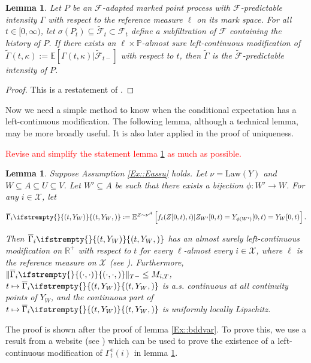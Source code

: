 \documentclass[12pt]{article}
\newcommand{\mb}{\mathbb}
\newcommand{\mc}{\mathcal}
\newcommand{\ra}{\rightarrow}
\newcommand{\ov}{\overline}
\newcommand{\te}{\text}
\newcommand{\tr}{\textcolor{red}}
\newcommand{\ind}{\hspace{24pt}}
\newcommand{\pr}{\mb{P}}							%
\newcommand{\ex}[1]{\mb{E}\left[#1\right]}			%
\newcommand{\exmu}[2]{\mb{E}^{#1}\left[#2\right]}	%
\newcommand{\defeq}{:=}								%
\newcommand{\sta}{\mc{X}}							%
\newcommand{\Sm}{\ell}								%
\newcommand{\F}{\mc{F}}								%
\newcommand{\vind}[1]{_{#1}}						%
\newcommand{\tmi}[1]{#1}							%
\newcommand{\vpara}[1]{^{#1}}						%
\newcommand{\stpara}[1]{_{#1}}						%
\newcommand{\tpara}[1]{_{#1}}						%
\newcommand{\tmepro}[3]{
\ifstrempty{#3}{
	\left(#1,#2\right)}{
	\left(#1,#2,#3\right)}}							%
\newcommand{\Xg}{Y}									%
\newcommand{\alt}[1]{\tilde{#1}}					%
\renewcommand{\mark}{\kappa}						%
\newcommand{\ratee}{\Gamma}							%
\newcommand{\cratee}{\alt{\ratee}}					%
\newcommand{\grate}{\ov{\ratee}}					%
\newcommand{\rp}{P}									%
\newcommand{\mm}{\nu}								%
\newcommand{\law}{\te{Law}}							%
\newcommand{\const}{M}								%
\newcommand{\sttpara}[2]{_{#1,#2}}					%
\newcommand{\Xh}{Z}									%
\newtheorem{lem}[thms]{Lemma}
\begin{document}
\begin{lem}
Let \(\rp\) be an \(\F\)-adapted marked point process with \(\F\)-predictable intensity \(\ratee\) with respect to the reference measure \(\Sm\) on its mark space. For all \(t \in [0,\infty)\), let \(\sigma(\rp_{t}) \subseteq \alt{\F}_{t}\subset \F_{t}\) define a subfiltration of \(\F\) containing the history of \(\rp\). If there exists an \(\ell\times \pr\)-almost sure left-continuous modification of \(\cratee(t,\mark) := \ex{\ratee(t,\mark)|\alt{\F}_{t-}}\) with respect to \(t\), then \(\cratee\) is the \(\alt{\F}\)-predictable intensity of \(\rp\). 
\label{Ex::filtering}
\end{lem}

\begin{proof}
This is a restatement of \cite[theorem 14.3.III]{DalVer08}.
\end{proof}

Now we need a simple method to know when the conditional expectation has a left-continuous modification. The following lemma, although a technical lemma, may be more broadly useful. It is also later applied in the proof of uniqueness.

\ind \tr{Revise and simplify the statement lemma \ref{Ex::leftmod} as much as possible.}
\begin{lem}
Suppose Assumption \ref{Ex::Eassu} holds. Let \(\mm = \law(\Xg)\) and \(W\subseteq A \subseteq U\subseteq V\). Let \(W'\subseteq A\) be such that there exists a bijection \(\phi:W' \ra W\). For any \(i \in \sta\), let

\[\grate\stpara{i}\tmepro{t}{\Xg\vind{W}}{} \defeq \exmu{\Xh\sim \mm\vpara{A}}{f_t(\Xh\tmi{[0,t)},i)|\Xh\vind{W'}\tmi{[0,t)} = \Xg\vind{\phi(W')}\tmi{[0,t)} = \Xg\vind{W}\tmi{[0,t)}}.\]

Then \(\grate\stpara{i}\tmepro{t}{\Xg\vind{W}}{}\) has an almost surely left-continuous modification on \(\mb{R}^+\) with respect to \(t\) for every \(\ell\)-almost every \(i \in \sta\), where \(\ell\) is the reference measure on \(\sta\) (see \cite[section \ref{F-not::p}]{F}). Furthermore, \(\|\grate\stpara{i}\tmepro{\cdot}{\cdot}{}\|\tpara{T-} \leq \const\sttpara{i}{T}\), \(t\mapsto\grate\stpara{i}\tmepro{t}{\Xg\vind{W}}{}\) is a.s. continuous at all continuity points of \(\Xg\vind{W}\), and the continuous part of \(t\mapsto\grate\stpara{i}\tmepro{t}{\Xg\vind{W}}{}\) is uniformly locally Lipschitz.
\label{Ex::leftmod}
\end{lem}

The proof is shown after the proof of lemma \ref{Ex::bddvar}. To prove this, we use a result from a website (see \cite[section \ref{F-not::p}]{F}) which can be used to prove the existence of a left-continuous modification of \(\ratee\vpara{v}\tpara{t}(i)\) in lemma \ref{Ex::leftmod}.
\end{document}
